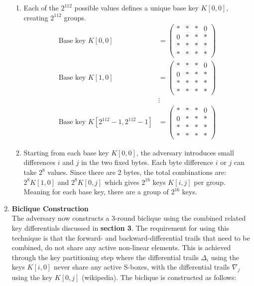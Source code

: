 \documentclass{report}
\begin{document}
\begin{enumerate}[start = 1, label={(\bfseries Step\arabic*):}]
\begin{enumerate}
        \item Each of the $2^{112}$ possible values defines a unique base key $K[0,0]$, creating $2^{112}$ groups.
         \begin{align*}
            \text{Base key } K[0,0] &= \begin{pmatrix}
            * & * & * & 0 \\
            0 & * & * & * \\
            * & * & * & * \\
            * & * & * & *
            \end{pmatrix} \\
            \text{Base key } K[1,0] &= \begin{pmatrix}
            * & * & * & 0 \\
            0 & * & * & * \\
            * & * & * & * \\
            * & * & * & *
            \end{pmatrix} \\
            &\vdots \\
            \text{Base key } K[2^{112}-1, 2^{112}-1] &= \begin{pmatrix}
            * & * & * & 0 \\
            0 & * & * & * \\
            * & * & * & * \\
            * & * & * & *
            \end{pmatrix}
            \end{align*}
        \item Starting from each base key $K[0,0]$, the adversary introduces small differences $i$ and $j$ in the two fixed bytes. Each byte difference $i$ or $j$ can take $2^8$ values. Since there are 2 bytes, the total combinations are: $2^8 K[1,0]$ and $2^8 K[0,j]$ which gives $2^{16}$ keys $K[i,j]$ per group. Meaning for each base key, there are a group of $2^{16}$ keys.

    \end{enumerate}
    \item \textbf{Biclique Construction}\\The adversary now constructs a 3-round biclique using the combined related key differentials discussed in \textbf{section 3}. The requirement for using this technique is that the forward- and backward-differential trails that need to be combined, do not share any active non-linear elements. This is achieved through the key partitioning step where the differential trails $\Delta_i$ using the keys $K[i,0]$ never share any active S-boxes, with the differential trails $\nabla_j$ using the key $K[0,j]$ (wikipedia). The biclique is constructed as follows:


\end{enumerate}
\end{document}
